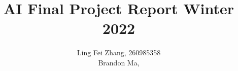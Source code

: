 \documentclass[12pt,a4paper]{article}
\author{Ling Fei Zhang, 260985358\\
Brandon Ma,
}
\begin{document}
\title{AI Final Project Report Winter 2022}    
\maketitle
\end{document}
